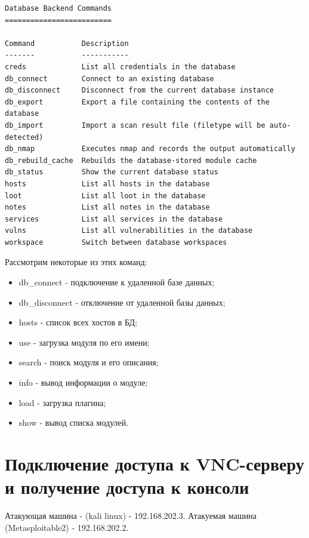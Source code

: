 \documentclass[10pt,a4paper]{report}
\begin{document}
\begin{lstlisting}
Database Backend Commands
=========================

Command           Description
-------           -----------
creds             List all credentials in the database
db_connect        Connect to an existing database
db_disconnect     Disconnect from the current database instance
db_export         Export a file containing the contents of the database
db_import         Import a scan result file (filetype will be auto-detected)
db_nmap           Executes nmap and records the output automatically
db_rebuild_cache  Rebuilds the database-stored module cache
db_status         Show the current database status
hosts             List all hosts in the database
loot              List all loot in the database
notes             List all notes in the database
services          List all services in the database
vulns             List all vulnerabilities in the database
workspace         Switch between database workspaces
		\end{lstlisting}
		
		Рассмотрим некоторые из этих команд:
		\begin{itemize}
			\item db\_connect - подключение к удаленной базе данных;
			\item db\_disconnect - отключение от удаленной базы данных;
			\item hosts - список всех хостов в БД;
			\item use - загрузка модуля по его имени;
			\item search - поиск модуля и его описания;
			\item info - вывод информации о модуле;
			\item load - загрузка плагина;
			\item show - вывод списка модулей.
		\end{itemize}
	
	\section{Подключение доступа к VNC-серверу и получение доступа к консоли}
		Атакующая машина - (kali linux) - 192.168.202.3. Атакуемая машина 
		(Metasploitable2) - 192.168.202.2.
		
\end{document}
